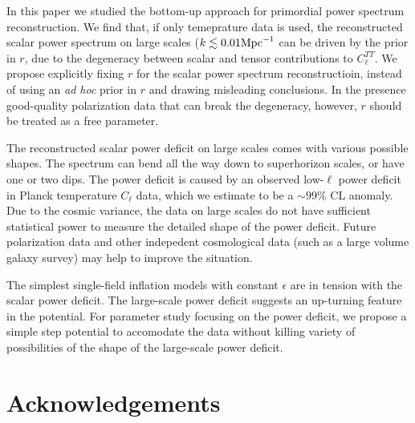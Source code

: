 \documentclass[11pt]{article}
\begin{document}
In this paper we studied the bottom-up approach for primordial power spectrum reconstruction. We find that, if only temeprature data is used, the reconstructed scalar power spectrum on large scales ($k\lesssim 0.01 {\rm Mpc}^{-1}$ can be driven by the prior in $r$, due to the degeneracy between scalar and tensor contributions to $C_\ell^{TT}$. We propose explicitly fixing $r$ for the scalar power spectrum reconstructioin, instead of using an {\it ad hoc} prior in $r$ and drawing misleading conclusions. In the presence good-quality polarization data that can break the degeneracy, however, $r$ should be treated as a free parameter.

The reconstructed scalar power deficit on large scales comes with various possible shapes. The spectrum can bend all the way down to superhorizon scales, or have one or two dips. The power deficit is caused by an observed low-$\ell$ power deficit in Planck temperature $C_\ell$ data, which we estimate to be a $\sim 99\%$ CL anomaly. Due to the cosmic variance, the data on large scales do not have sufficient statistical power to measure the detailed shape of the power deficit. Future polarization data and other indepedent cosmological data (such as a large volume galaxy survey) may help to improve the situation.

The simplest single-field inflation models with constant $\epsilon$ are in tension with the scalar power deficit. The large-scale power deficit suggests an up-turning feature in the potential. For parameter study focusing on the power deficit, we propose a simple step potential to accomodate the data without killing variety of possibilities of the shape of the large-scale power deficit.

\section*{Acknowledgements}


  

\end{document}
